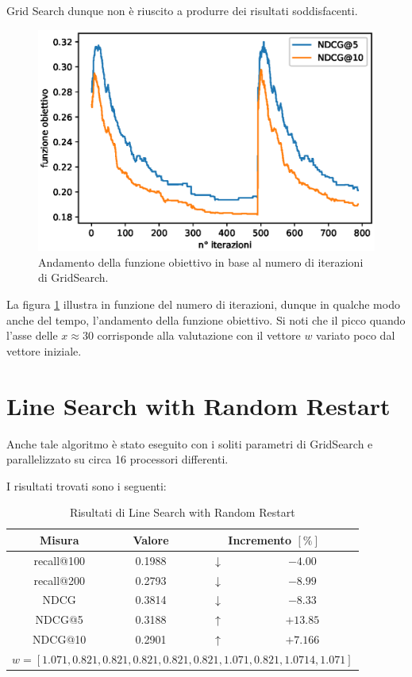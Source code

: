 Grid Search dunque non è riuscito a produrre dei risultati soddisfacenti.
\pagebreak

\begin{figure}[h!]
	\centering
	\includegraphics[width=0.7\linewidth]{figure/gs_search}
	\caption[Andamento della funzione obiettivo utilizzando GridSearch]{Andamento della funzione obiettivo in base al numero di iterazioni di GridSearch.}
	\label{fig:gssearch}
\end{figure}

La figura \ref{fig:gssearch} illustra in funzione del numero di iterazioni, dunque in qualche modo anche del tempo, l'andamento
della funzione obiettivo. Si noti che il picco quando l'asse delle $x \approx 30$ corrisponde alla valutazione con il vettore $w$ variato
poco dal vettore iniziale.

\newpage

\section{Line Search with Random Restart}

Anche tale algoritmo è stato eseguito con i soliti parametri di GridSearch e parallelizzato
su circa 16 processori differenti.

I risultati trovati sono i seguenti:

\begin{table}[h!]
	\centering
	\begin{tabular}{|c|c|c|c|}
		\hline
		\textbf{Misura} & \textbf{Valore} & \multicolumn{2}{|c|}{\textbf{Incremento} $\left[\%\right]$} \\
		\hline
		recall@100 &  0.1988 & $\downarrow$ & $-4.00$   \\
		\hline
		recall@200 & 0.2793  & $\downarrow$ & $-8.99$ \\
		\hline
		NDCG & 0.3814 & $\downarrow$ & $-8.33$\\
		\hline
		NDCG@5 & 0.3188 & $\uparrow$ & $+13.85$ \\
		\hline
		NDCG@10 & 0.2901 & $\uparrow$ & $+7.166$ \\
		\hline
		\multicolumn{4}{|c|}{
			$w = [1.071, 0.821, 0.821, 0.821, 0.821, 0.821, 1.071, 0.821, 1.0714, 1.071]$ 
		} \\
	\hline
	\end{tabular}
	\caption{Risultati di Line Search with Random Restart}
\end{table}

